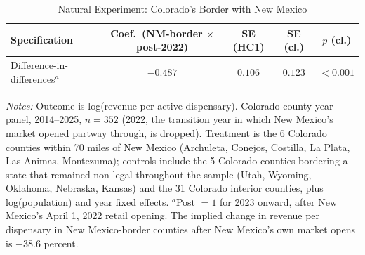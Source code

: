 \begin{table}[htbp]
\centering
\caption{Natural Experiment: Colorado's Border with New Mexico}
\label{tab:co_nm}
\small
\begin{tabular}{lcccc}
\toprule
Specification & Coef.\ (NM-border $\times$ post-2022) & SE (HC1) & SE (cl.) & $p$ (cl.) \\
\midrule
Difference-in-differences$^{a}$ & $-0.487$ & $0.106$ & $0.123$ & $<0.001$ \\
\bottomrule
\end{tabular}
\begin{minipage}{0.95\textwidth}
\vspace{0.3em}
\footnotesize
\textit{Notes:} Outcome is log(revenue per active dispensary). Colorado county-year panel, 2014--2025, $n=352$
(2022, the transition year in which New Mexico's market opened partway through, is dropped). Treatment is the
6 Colorado counties within 70 miles of New Mexico (Archuleta, Conejos, Costilla, La Plata, Las Animas,
Montezuma); controls include the 5 Colorado counties bordering a state that remained non-legal throughout the
sample (Utah, Wyoming, Oklahoma, Nebraska, Kansas) and the 31 Colorado interior counties, plus
log(population) and year fixed effects. $^{a}$Post $=1$ for 2023 onward, after New Mexico's April 1, 2022
retail opening. The implied change in revenue per dispensary in New Mexico-border counties after New Mexico's
own market opens is $-38.6$ percent.
\end{minipage}
\end{table}
